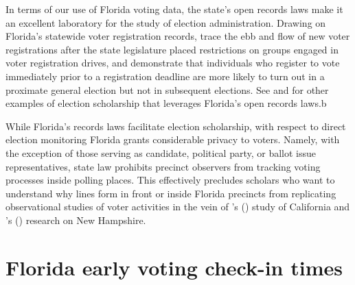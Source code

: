 \documentclass[12pt,titlepage]{article}
\newcommand{\possessivecite}[1]{\citeauthor{#1}'s (\citeyear{#1})}
\begin{document}
In terms of our use of Florida voting data, the state's open records
laws make it an excellent laboratory for the study of election
administration. Drawing on Florida's statewide voter registration
records, \cite{herron_smith2013} trace the ebb and flow of new voter
registrations after the state legislature placed restrictions on
groups engaged in voter registration drives, and
\cite{shinosmith:registrationtiming} demonstrate that individuals who
register to vote immediately prior to a registration deadline are more
likely to turn out in a proximate general election but not in
subsequent elections.  See  \cite{amos_etal2017} and
\cite{herronsmith:closingtimes} for other examples of election
scholarship that leverages Florida's open records laws.b






While Florida's records laws facilitate election scholarship, with
respect to direct election monitoring Florida grants considerable
privacy to voters. Namely, with the exception of those serving as
candidate, political party, or ballot issue representatives, state law
prohibits precinct observers from tracking voting processes inside
polling places. This effectively precludes scholars who want to
understand why lines form in front or inside Florida precincts from
replicating observational studies of voter activities in the vein of
\possessivecite{spencermarkovits:renege} study of California and
\possessivecite{herronsmith:hanoverstudy} research on New Hampshire.

\section*{Florida early voting check-in times}
\end{document}
